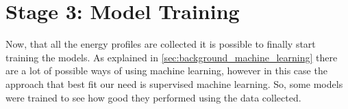 \section{Stage 3: Model Training} \label{sec:work_stage3_model_training}

Now, that all the energy profiles are collected it is possible to finally start training the models. As explained in \ref{sec:background_machine_learning} there are a lot of possible ways of using machine learning, however in this case the approach that best fit our need is supervised machine learning. So, some models were trained to see how good they performed using the data collected.